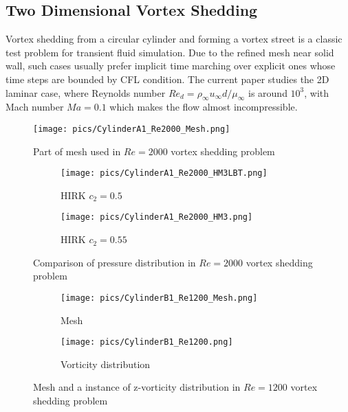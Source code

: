 \documentclass[preprint,12pt]{elsarticle}
\begin{document}
\subsection{Two Dimensional Vortex Shedding}

Vortex shedding from a circular cylinder and forming a vortex street
is a classic test problem for transient fluid simulation. Due to the refined 
mesh near solid wall, such cases usually prefer implicit time marching
over explicit ones whose time steps are bounded by CFL condition.
The current paper studies the 2D laminar case, where
Reynolds number 
$Re_d=\rho_\infty u_\infty d / \mu_\infty $ is around $10^3$, 
with Mach number $Ma=0.1$ which makes the flow almost incompressible.

\begin{figure}[htbp]
    \centering
    \texttt{[image: pics/CylinderA1\_Re2000\_Mesh.png]}
    \caption[]{Part of mesh used in $Re=2000$ vortex shedding problem}
    \label{fig:CylinderRe2000_Mesh}
\end{figure}

\begin{figure}[htbp]
    \centering
    \begin{subfigure}{0.5\textwidth}
        \texttt{[image: pics/CylinderA1\_Re2000\_HM3LBT.png]}
        \caption[]{HIRK $c_2=0.5$}
        \label{sfig:CylinderRe2000_HM3LBT}
    \end{subfigure}\hfill
    \begin{subfigure}{0.5\textwidth}
        \texttt{[image: pics/CylinderA1\_Re2000\_HM3.png]}
        \caption[]{HIRK $c_2=0.55$}
        \label{sfig:CylinderRe2000_HM3}
    \end{subfigure}
    \caption[]{Comparison of pressure distribution in $Re=2000$ vortex shedding problem}
    \label{fig:CylinderRe2000}
\end{figure}

\begin{figure}[htbp]
    \centering
    \begin{subfigure}{0.5\textwidth}
        \texttt{[image: pics/CylinderB1\_Re1200\_Mesh.png]}
        \caption[]{Mesh}
        \label{sfig:CylinderRe1200Demo_Mesh}
    \end{subfigure}\hfill
    \begin{subfigure}{0.5\textwidth}
        \texttt{[image: pics/CylinderB1\_Re1200.png]}
        \caption[]{Vorticity distribution}
        \label{sfig:CylinderRe1200Demo_Vort}
    \end{subfigure}
    \caption[]{Mesh and a instance of z-vorticity distribution
        in $Re=1200$ vortex shedding problem}
    \label{fig:CylinderRe1200Demo}
\end{figure}
\end{document}
